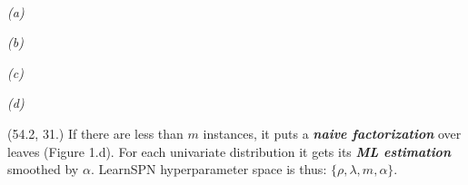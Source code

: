 \documentclass[final]{beamer}
\begin{document}
\begin{frame}{}
\begin{textblock}{60}
{\begin{minipage}[t]{8.1cm}
    \end{minipage}}\hspace{30pt}\\
  \vspace{-20pt}\hspace{80pt}\begin{minipage}[t]{7cm}
    \scriptsize\emph{(a)}
  \end{minipage}\hspace{80pt}\begin{minipage}[t]{7cm}
    \scriptsize\emph{(b)}
  \end{minipage}\hspace{175pt}\begin{minipage}[t]{7cm}
    \scriptsize\emph{(c)}
  \end{minipage}\hspace{175pt}\begin{minipage}[t]{7cm}
    \scriptsize\emph{(d)}
  \end{minipage}
    
    
  \end{textblock}
  
  
  \begin{textblock}{25.7}(54.2, 31.)
    \footnotesize
    If there are less than $m$ instances, it puts a \textbf{\emph{naive
        factorization}} over leaves (Figure 1.d). For each univariate distribution
    it gets its \emph{\textbf{ML estimation}} smoothed by $\alpha$. LearnSPN
    hyperparameter space is thus: $\{\rho, \lambda, m, \alpha\}$.\par\bigskip


\end{textblock}
\end{frame}
\end{document}
